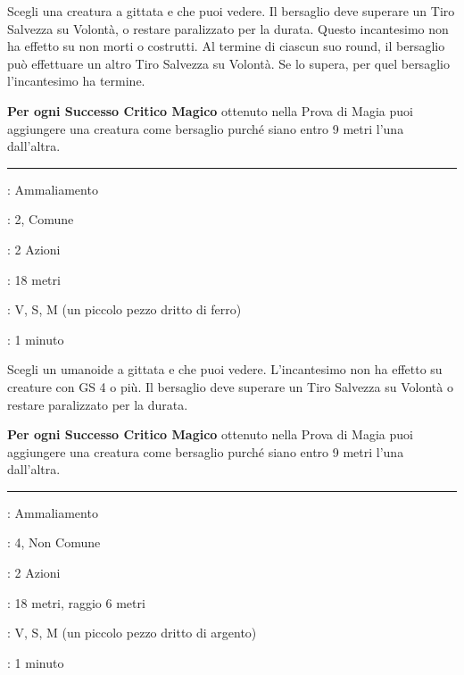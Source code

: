 \begin{multicols}{2}
Scegli una creatura a gittata e che puoi vedere. Il bersaglio deve superare un Tiro Salvezza su Volontà, o restare paralizzato per la durata. Questo incantesimo non ha effetto su non morti o costrutti. Al termine di ciascun suo round, il bersaglio può effettuare un altro Tiro Salvezza su Volontà. Se lo supera, per quel bersaglio l'incantesimo ha termine.

\textbf{Per ogni Successo Critico Magico} ottenuto nella Prova di Magia puoi aggiungere una creatura come bersaglio purché siano entro 9 metri l'una dall'altra.

\smallskip\noindent\rule{\linewidth}{2pt} \hypertarget{Blocca Persona}{}\medskip{}
\noindent
\begin{description}[noitemsep, topsep=0pt, parsep=0pt, partopsep=0pt, leftmargin=0cm, labelwidth=2.8cm]
	\item[\textbf{Lista di Magia}]: Ammaliamento
	\item[\textbf{Livello}]: 2, Comune
	\item[\textbf{T. di Lancio}]: 2 Azioni
	\item[\textbf{Gittata}]: 18 metri
	\item[\textbf{Componenti}]: V, S, M (un piccolo pezzo dritto di ferro)
	\item[\textbf{Durata}]: 1 minuto
\end{description}

Scegli un umanoide a gittata e che puoi vedere. L'incantesimo non ha effetto su creature con GS 4 o più. Il bersaglio deve superare un Tiro Salvezza su Volontà o restare paralizzato per la durata.

\textbf{Per ogni Successo Critico Magico} ottenuto nella Prova di Magia puoi aggiungere una creatura come bersaglio purché siano entro 9 metri l'una dall'altra.

\smallskip\noindent\rule{\linewidth}{2pt} \hypertarget{Blocca Persona Avanzato}{}\medskip{}
\noindent
\begin{description}[noitemsep, topsep=0pt, parsep=0pt, partopsep=0pt, leftmargin=0cm, labelwidth=2.8cm]
	\item[\textbf{Lista di Magia}]: Ammaliamento
	\item[\textbf{Livello}]: 4, Non Comune
	\item[\textbf{T. di Lancio}]: 2 Azioni
	\item[\textbf{Gittata}]: 18 metri, raggio 6 metri
	\item[\textbf{Componenti}]: V, S, M (un piccolo pezzo dritto di argento)
	\item[\textbf{Durata}]: 1 minuto
\end{description}


\end{multicols}
